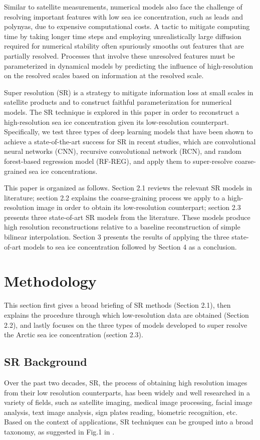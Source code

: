 \documentclass[]{copernicus}
\begin{document}
Similar to satellite measurements, numerical models also face the challenge of resolving important features with low sea ice concentration, such as leads and polynyas, due to expensive computational costs. A tactic to mitigate computing time by taking longer time steps and employing unrealistically large diffusion required for numerical stability often spuriously smooths out features that are partially resolved. Processes that involve these unresolved features must be parameterized in dynamical models by predicting the influence of high-resolution on the resolved scales based on information at the resolved scale.

Super resolution (SR) is a strategy to mitigate information loss at small scales in satellite products and to construct faithful parameterization for numerical models. The SR technique is explored in this paper in order to reconstruct a high-resolution sea ice concentration given its low-resolution counterpart. Specifically, we test three types of deep learning models that have been shown to achieve a state-of-the-art success for SR in recent studies, which are convolutional neural networks (CNN), recursive convolutional network (RCN), and random forest-based regression model (RF-REG), and apply them to super-resolve coarse-grained sea ice concentrations.  

This paper is organized as follows. Section 2.1 reviews the relevant SR models in literature; section 2.2 explains the coarse-graining process we apply to a high-resolution image in order to obtain its low-resolution counterpart; section 2.3 presents three state-of-art SR models from the literature. These models produce high resolution reconstructions relative to a baseline reconstruction of simple bilinear interpolation. Section 3 presents the results of applying the three state-of-art models to sea ice concentration followed by Section 4 as a conclusion.

\section{Methodology}
This section first gives a broad briefing of SR methods (Section 2.1), then explains the procedure through which low-resolution data are obtained (Section 2.2), and lastly focuses on the three types of models developed to super resolve the Arctic sea ice concentration (section 2.3). 

\subsection{SR Background}
Over the past two decades, SR, the process of obtaining high resolution images from their low resolution counterparts, has been widely and well researched in a variety of fields, such as satellite imaging, medical image processing, facial image analysis, text image analysis, sign plates reading, biometric recognition, etc. Based on the context of applications, SR techniques can be grouped into a broad taxonomy, as suggested in Fig.1 in \cite{nasrollahi2014super}. 
\end{document}
